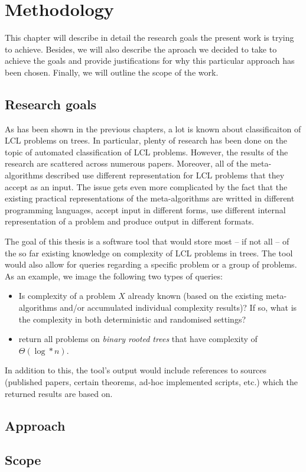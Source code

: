 \chapter{Methodology}
\label{chapter:methods}

This chapter will describe in detail the research goals the present work
is trying to achieve. Besides, we will also describe the aproach we decided
to take to achieve the goals and provide justifications for why this particular
approach has been chosen. Finally, we will outline the scope of the work.

\section{Research goals}

As has been shown in the previous chapters, a lot is known about classificaiton
of LCL problems on trees. In particular, plenty of research has been done
on the topic of automated classification of LCL problems. However, the
results of the research are scattered across numerous papers. Moreover,
all of the meta-algorithms described use different representation for LCL
problems that they accept as an input.
The issue gets even more complicated by the fact that the existing practical representations
of the meta-algorithms are writted in different programming languages, accept input in
different forms,
use different internal representation of a problem and produce output in different
formats.

The goal of this thesis is a software tool that would store most -- if not all -- of
the so far existing knowledge on complexity of LCL problems in trees.
The tool would also allow for queries regarding a specific problem or a group of
problems. As an example, we image the following two types of queries:
\begin{itemize}
  \item Is complexity of a problem $X$ already known (based on the existing meta-algorithms
  and/or accumulated individual complexity results)? If so, what is the complexity in both
  deterministic and randomised settings?
  \item return all problems on \emph{binary rooted trees} that have complexity of
  $\Theta(\log* n)$.
\end{itemize}
In addition to this, the tool’s output would include references to sources
(published papers, certain theorems, ad-hoc implemented scripts, etc.)
which the returned results are based on.

\section{Approach}

\section{Scope}
